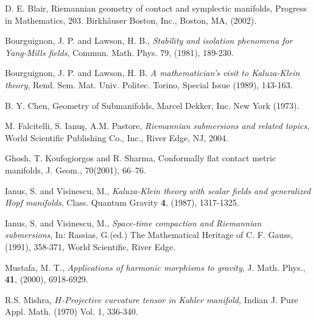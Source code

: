 \documentclass{birkjour}
\theoremstyle{definition}
\theoremstyle{remark}
\numberwithin{equation}{section}
\begin{document}
\begin{thebibliography}{99}
	 D. E. Blair, Riemannian geometry of contact and symplectic
	manifolds, Progress in Mathematics, 203. Birkhâuser Boston, Inc., Boston,
	MA, (2002).
	
	 Bourguignon, J. P. and Lawson, H. B., {\it Stability and isolation
		phenomena for Yang-Mills fields}, Commun. Math. Phys. 79, (1981), 189-230.
	
	 Bourguignon, J. P. and Lawson, H. B. {\it A mathematician's visit to Kaluza-Klein theory}, Rend. Sem. Mat. Univ. Politec. Torino, Special Issue (1989), 143-163.
	
	
	
	
	 B. Y. Chen, Geometry of Submanifolds, Marcel Dekker, Inc. New
	York (1973).
	
	 M. Falcitelli, S. Ianu\c{s}, A.M. Pastore, \emph{Riemannian submersions and related topics,} World Scientific
	Publishing Co., Inc., River Edge, NJ, 2004.
	
	  Ghosh, T. Koufogiorgos and R. Sharma, Conformally flat
	contact metric manifolds, J. Geom., 70(2001), 66--76.
	
	
	 Ianus, S. and Visinescu,  M., {\it Kaluza-Klein theory with scalar
		fields and generalized Hopf manifolds}, Class. Quantum Gravity \textbf{4}, (1987),
	1317-1325.
	
	 Ianus, S. and Visinescu, M., \textit{Space-time compaction and
		Riemannian submersions}, In: Rassias, G.(ed.) The Mathematical Heritage of C.
	F. Gauss, (1991), 358-371, World Scientific, River Edge.
	
	 Mustafa, M. T., \textit{Applications of harmonic morphisms to gravity}, J. Math. Phys., \textbf{41}, (2000), 6918-6929.
	
	 {R.S. Mishra, \emph{$H$-Projective curvature tensor in Kahler manifold,} Indian J. Pure Appl. Math. (1970) Vol. 1, 336-340. }
	

\end{thebibliography}
\end{document}
